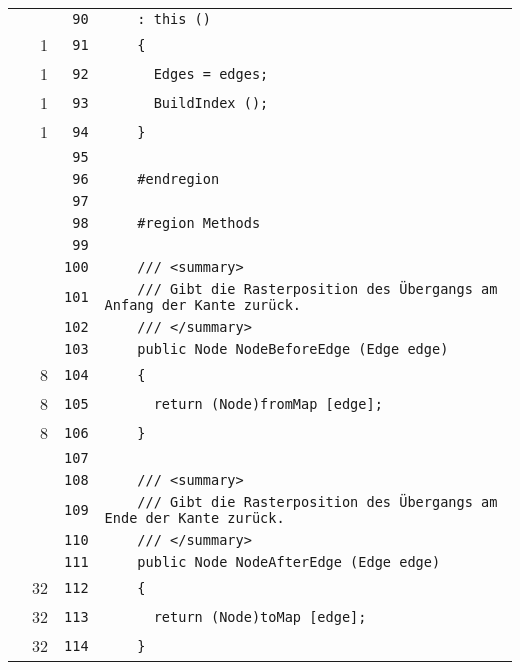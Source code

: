 \documentclass[a4paper,10pt]{article}
\begin{document}
\begin{longtable}[l]{lrrl}
\cellcolor{gray} &  & \verb~90~ & \verb~    : this ()~\\
\cellcolor{green} & 1 & \verb~91~ & \verb~    {~\\
\cellcolor{green} & 1 & \verb~92~ & \verb~      Edges = edges;~\\
\cellcolor{green} & 1 & \verb~93~ & \verb~      BuildIndex ();~\\
\cellcolor{green} & 1 & \verb~94~ & \verb~    }~\\
\cellcolor{gray} &  & \verb~95~ & \verb~~\\
\cellcolor{gray} &  & \verb~96~ & \verb~    #endregion~\\
\cellcolor{gray} &  & \verb~97~ & \verb~~\\
\cellcolor{gray} &  & \verb~98~ & \verb~    #region Methods~\\
\cellcolor{gray} &  & \verb~99~ & \verb~~\\
\cellcolor{gray} &  & \verb~100~ & \verb~    /// <summary>~\\
\cellcolor{gray} &  & \verb~101~ & \verb~    /// Gibt die Rasterposition des Übergangs am Anfang der Kante zurück.~\\
\cellcolor{gray} &  & \verb~102~ & \verb~    /// </summary>~\\
\cellcolor{gray} &  & \verb~103~ & \verb~    public Node NodeBeforeEdge (Edge edge)~\\
\cellcolor{green} & 8 & \verb~104~ & \verb~    {~\\
\cellcolor{green} & 8 & \verb~105~ & \verb~      return (Node)fromMap [edge];~\\
\cellcolor{green} & 8 & \verb~106~ & \verb~    }~\\
\cellcolor{gray} &  & \verb~107~ & \verb~~\\
\cellcolor{gray} &  & \verb~108~ & \verb~    /// <summary>~\\
\cellcolor{gray} &  & \verb~109~ & \verb~    /// Gibt die Rasterposition des Übergangs am Ende der Kante zurück.~\\
\cellcolor{gray} &  & \verb~110~ & \verb~    /// </summary>~\\
\cellcolor{gray} &  & \verb~111~ & \verb~    public Node NodeAfterEdge (Edge edge)~\\
\cellcolor{green} & 32 & \verb~112~ & \verb~    {~\\
\cellcolor{green} & 32 & \verb~113~ & \verb~      return (Node)toMap [edge];~\\
\cellcolor{green} & 32 & \verb~114~ & \verb~    }~\\

\end{longtable}
\end{document}
